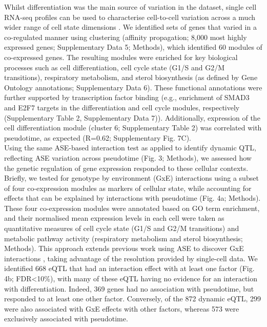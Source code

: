 Whilst differentiation was the main source of variation in the dataset, single cell RNA-seq profiles can be used to characterise cell-to-cell variation across a much wider range of cell state dimensions \cite{buettner2015computational, buettner2017f, fan2016characterizing}. 
We identified sets of genes that varied in a co-regulated manner using clustering (affinity propagation; 8,000 most highly expressed genes; Supplementary Data 5; Methods), which identified 60 modules of co-expressed genes. 
The resulting modules were enriched for key biological processes such as cell differentiation, cell cycle state (G1/S and G2/M transitions), respiratory metabolism, and sterol biosynthesis (as defined by Gene Ontology annotations; Supplementary Data 6). 
These functional annotations were further supported by transcription factor binding (e.g., enrichment of SMAD3 and E2F7 targets in the differentiation and cell cycle modules, respectively (Supplementary Table 2, Supplementary Data 7)). 
Additionally, expression of the cell differentiation module (cluster 6; Supplementary Table 2) was correlated with pseudotime, as expected (R=0.62; Supplementary Fig. 7C).\\

Using the same ASE-based interaction test as applied to identify dynamic QTL, reflecting ASE variation across pseudotime (Fig. 3; Methods), we assessed how the genetic regulation of gene expression responded to these cellular contexts. 
Briefly, we tested for genotype by environment (GxE) interactions using a subset of four co-expression modules as markers of cellular state, while accounting for effects that can be explained by interactions with pseudotime (Fig. 4a; Methods). 
These four co-expression modules were annotated based on GO term enrichment, and their normalised mean expression levels in each cell were taken as quantitative measures of cell cycle state (G1/S and G2/M transitions) and metabolic pathway activity (respiratory metabolism and sterol biosynthesis; Methods). 
This approach extends previous work using ASE to discover GxE interactions \cite{knowles2017allele, moyerbrailean2016high}, taking advantage of the resolution provided by single-cell data. 
We identified 668 eQTL that had an interaction effect with at least one factor (Fig. 4b; FDR<10\%), with many of these eQTL having no evidence for an interaction with differentiation.
Indeed, 369 genes had no association with pseudotime, but responded to at least one other factor. 
Conversely, of the 872 dynamic eQTL, 299 were also associated with GxE effects with other factors, whereas 573 were exclusively associated with pseudotime.\\

